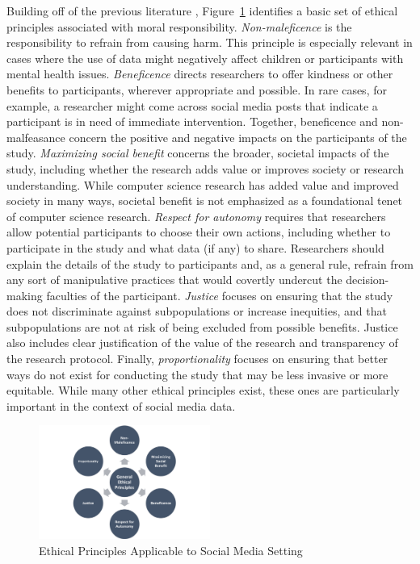 \documentclass[11pt]{article} %
\begin{document}
Building off of the previous literature \cite{ozkula2020,b88a5a9441354a02ac5b105291fff917,10.1177/1556264619901215,10.1080/15265161.2019.1611278,us1979belmont}, Figure~\ref{fig:ethical-pillars} identifies a basic set of ethical principles associated with moral responsibility. \textit{Non-maleficence} is the responsibility to refrain from causing harm. This principle is especially relevant in cases where the use of data might negatively affect children or participants with mental health issues. \textit{Beneficence} directs researchers to offer kindness or other benefits to participants, wherever appropriate and possible. In rare cases, for example, a researcher might come across social media posts that indicate a participant is in need of immediate intervention. Together, beneficence and non-malfeasance concern the positive and negative impacts on the participants of the study. \textit{Maximizing social benefit} concerns the broader, societal impacts of the study, including whether the research adds value or improves society or research understanding. While computer science research has added value and improved society in many ways, societal benefit is not emphasized as a foundational tenet of computer science research. \textit{Respect for autonomy} requires that researchers allow potential participants to choose their own actions, including whether to participate in the study and what data (if any) to share. Researchers should explain the details of the study to participants and, as a general rule, refrain from any sort of manipulative practices that would covertly undercut the decision-making faculties of the participant. \textit{Justice} focuses on ensuring that the study does not discriminate against subpopulations or increase inequities, and that subpopulations are not at risk of being excluded from possible benefits. Justice also includes clear justification of the value of the research and transparency of the research protocol. Finally, \textit{proportionality} focuses on ensuring that better ways do not exist for conducting the study that may be less invasive or more equitable. While many other ethical principles exist, these ones are particularly important in the context of social media data.

\begin{figure}[tb]
	\centering
	\includegraphics[width=0.5\textwidth,natwidth=850,natheight=550]{figs/ethical-pillars3.png}
	\caption{Ethical Principles Applicable to Social Media Setting}
	\label{fig:ethical-pillars}
\end{figure}
\end{document}
